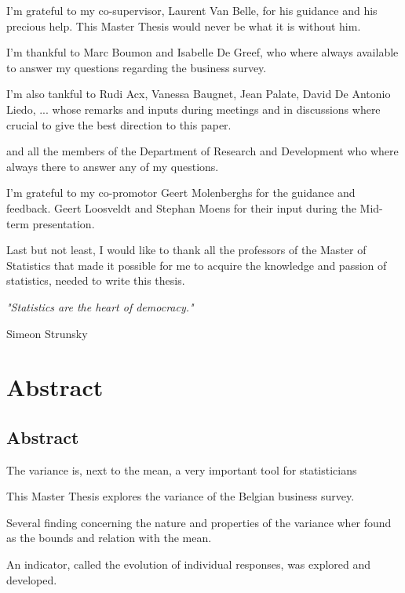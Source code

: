 \documentclass[12pt,a4paper,oneside]{book}
\newenvironment{bottompar}{\par\vspace*{\fill}}{\clearpage}
\newcommand\blankpage{%
    \null
    \thispagestyle{empty}%
    \addtocounter{page}{-1}%
    \newpage}
\begin{document}
I'm grateful to my co-supervisor, Laurent Van Belle, for his guidance and his precious help. This Master Thesis would never be what it is without him.

I'm thankful to Marc Boumon and Isabelle De Greef, who where always available to answer my questions regarding the business survey.

I'm also tankful to Rudi Acx, Vanessa Baugnet, Jean Palate, David De Antonio Liedo, ...
 whose remarks and inputs during meetings and in discussions where crucial to give the best direction to this paper.


and all the members of the Department of Research and Development who where always there to answer any of my questions.



I'm grateful to my co-promotor Geert Molenberghs for the guidance and feedback. Geert Loosveldt and Stephan Moens for their input during the Mid-term presentation.

Last but not least, I would like to thank all the professors of the Master of Statistics that made it possible for me to acquire the knowledge and passion of statistics, needed to write this thesis.


\begin{bottompar}
\textit{"Statistics are the heart of democracy." }

    Simeon Strunsky
\end{bottompar}

\blankpage


\chapter*{Abstract}


\section*{Abstract}

The variance is, next to the mean, a very important tool for statisticians

This Master Thesis explores the variance of the Belgian business survey.
 
Several finding concerning the nature and properties of the variance wher found as the bounds and relation with the mean.

An indicator, called the evolution of individual responses, was explored and developed.
\end{document}
